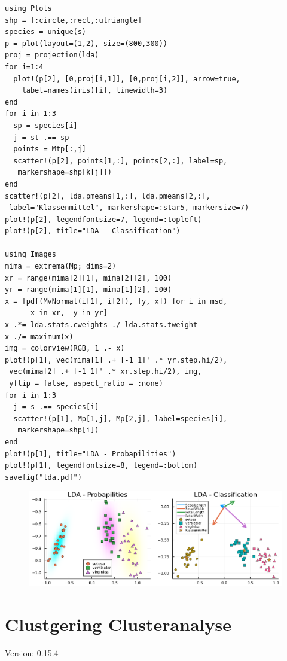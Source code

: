 \documentclass[10pt,twocolumn]{scrartcl}
\begin{document}
\begin{lstlisting}
using Plots
shp = [:circle,:rect,:utriangle]
species = unique(s)
p = plot(layout=(1,2), size=(800,300))
proj = projection(lda)
for i=1:4
  plot!(p[2], [0,proj[i,1]], [0,proj[i,2]], arrow=true,
    label=names(iris)[i], linewidth=3)
end
for i in 1:3
  sp = species[i]
  j = st .== sp
  points = Mtp[:,j]
  scatter!(p[2], points[1,:], points[2,:], label=sp,
   markershape=shp[k[j]])
end
scatter!(p[2], lda.pmeans[1,:], lda.pmeans[2,:],
 label="Klassenmittel", markershape=:star5, markersize=7)
plot!(p[2], legendfontsize=7, legend=:topleft)
plot!(p[2], title="LDA - Classification")

using Images
mima = extrema(Mp; dims=2)
xr = range(mima[2][1], mima[2][2], 100)
yr = range(mima[1][1], mima[1][2], 100)
x = [pdf(MvNormal(i[1], i[2]), [y, x]) for i in msd,
      x in xr,  y in yr]
x .*= lda.stats.cweights ./ lda.stats.tweight
x ./= maximum(x)
img = colorview(RGB, 1 .- x)
plot!(p[1], vec(mima[1] .+ [-1 1]' .* yr.step.hi/2),
 vec(mima[2] .+ [-1 1]' .* xr.step.hi/2), img,
 yflip = false, aspect_ratio = :none)
for i in 1:3
  j = s .== species[i]
  scatter!(p[1], Mp[1,j], Mp[2,j], label=species[i],
   markershape=shp[i])
end
plot!(p[1], title="LDA - Probapilities")
plot!(p[1], legendfontsize=8, legend=:bottom)
savefig("lda.pdf")
\end{lstlisting}

\begin{figure}[ht]
  \centering
  \includegraphics[width=.95\columnwidth]{lda.pdf}
\end{figure}

\section{Clustgering Clusteranalyse}

Version: 0.15.4
\end{document}
